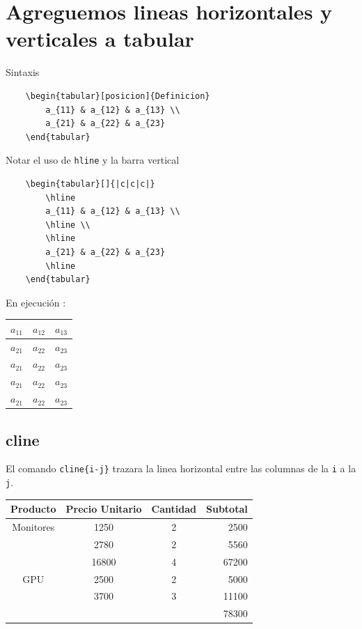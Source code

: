 \documentclass{article}
\begin{document}
\section{Agreguemos lineas horizontales y verticales a tabular}

\noindent Sintaxis

\begin{verbatim}
	\begin{tabular}[posicion]{Definicion}
		a_{11} & a_{12} & a_{13} \\
		a_{21} & a_{22} & a_{23}
	\end{tabular}
\end{verbatim}

Notar el uso de \verb*|hline| y la barra vertical

\begin{verbatim}
	\begin{tabular}[]{|c|c|c|}
		\hline
		a_{11} & a_{12} & a_{13} \\
		\hline \\
		\hline
		a_{21} & a_{22} & a_{23}
		\hline
	\end{tabular}
\end{verbatim}

En ejecución :
\begin{center}
\begin{tabular}[]{|c|c|c|}
	\hline
	$a_{11}$ & $a_{12}$ & $a_{13}$ \\
	\hline 
	$a_{21}$ & $a_{22}$ & $a_{23}$ \\
	\hline
	$a_{21}$ & $a_{22}$ & $a_{23}$ \\
	\hline
	$a_{21}$ & $a_{22}$ & $a_{23}$ \\
	\hline
	$a_{21}$ & $a_{22}$ & $a_{23}$ \\
	\hline
\end{tabular}
\end{center}

\subsection{cline}
El comando \verb*|cline{i-j}| trazara la linea horizontal entre las columnas de la \verb*|i| a la \verb*|j|.
\begin{center}
	\begin{tabular}{cccr}
		\hline
		Producto & Precio Unitario & Cantidad & Subtotal \\
		\hline
		Monitores & 1250 & 2 & 2500\\
				  & 2780 & 2 & 5560\\
				  & 16800 & 4 & 67200\\
		\hline
		GPU		  & 2500 & 2 & 5000\\
				  & 3700 & 3 & 11100\\
				  \cline{4-4}
				  &      &   & 78300
	\end{tabular}
\end{center}
\end{document}

